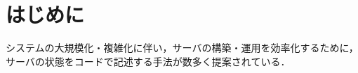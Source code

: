 \section{はじめに}

システムの大規模化・複雑化に伴い，サーバの構築・運用を効率化するために，サーバの状態をコードで記述する手法が数多く提案されている\cite{cfengine, puppet}．
